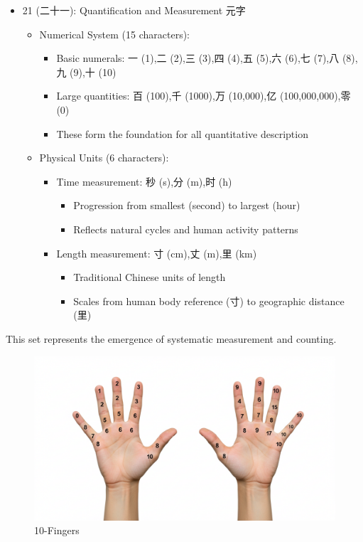 \begin{itemize}
\tightlist
\item
  21 (二十一): Quantification and Measurement 元字

  \begin{itemize}
  \tightlist
  \item
    Numerical System (15 characters):

    \begin{itemize}
    \tightlist
    \item
      Basic numerals: 一 (1),二 (2),三 (3),四 (4),五 (5),六 (6),七
      (7),八 (8),九 (9),十 (10)
    \item
      Large quantities: 百 (100),千 (1000),万 (10,000),亿
      (100,000,000),零 (0)
    \item
      These form the foundation for all quantitative description
    \end{itemize}
  \item
    Physical Units (6 characters):

    \begin{itemize}
    \tightlist
    \item
      Time measurement: 秒 (s),分 (m),时 (h)

      \begin{itemize}
      \tightlist
      \item
        Progression from smallest (second) to largest (hour)
      \item
        Reflects natural cycles and human activity patterns
      \end{itemize}
    \item
      Length measurement: 寸 (cm),丈 (m),里 (km)

      \begin{itemize}
      \tightlist
      \item
        Traditional Chinese units of length
      \item
        Scales from human body reference (寸) to geographic distance
        (里)
      \end{itemize}
    \end{itemize}
  \end{itemize}
\end{itemize}

This set represents the emergence of systematic measurement and
counting.

\begin{figure}
\centering
\includegraphics{./images/10-fingers.jpg}
\caption{10-Fingers}
\end{figure}

